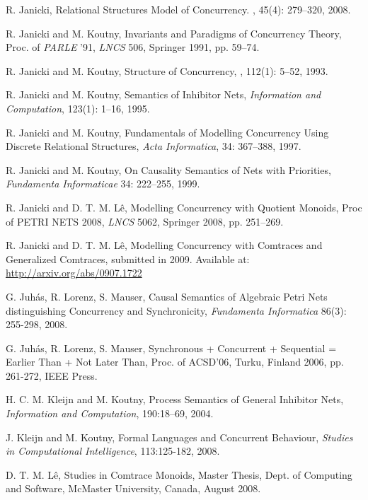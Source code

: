 \documentclass{llncs}
\begin{document}
\begin{thebibliography}{19}
R. Janicki,
\newblock Relational Structures Model of Concurrency.
, 45(4): 279--320, 2008.

R. Janicki and M. Koutny,
Invariants and Paradigms of Concurrency Theory, Proc. of \emph{PARLE} '91,
{\em LNCS} 506, Springer 1991, pp. 59--74.

R. Janicki and M. Koutny,
\newblock Structure of Concurrency,
, 112(1): 5--52, 1993.

R. Janicki and M. Koutny,
 Semantics of Inhibitor Nets,
 {\em Information and Computation}, 123(1): 1--16, 1995.

R. Janicki and M. Koutny, Fundamentals of Modelling Concurrency Using Discrete
Relational Structures, {\em Acta Informatica}, 34: 367--388, 1997.

R. Janicki and M. Koutny, On Causality Semantics of Nets with Priorities,
{\em Fundamenta Informaticae} 34: 222--255, 1999.

R. Janicki and D. T. M. L\^e, Modelling Concurrency with Quotient Monoids, Proc of PETRI NETS 2008, {\em LNCS} 5062, Springer 2008, pp. 251--269.

R. Janicki and D. T. M. L\^e, Modelling Concurrency with Comtraces and Generalized Comtraces, submitted in 2009. Available at: \href{http://arxiv.org/abs/0907.1722}{http://arxiv.org/abs/0907.1722}


G. Juh\'{a}s, R. Lorenz, S. Mauser, Causal Semantics of Algebraic Petri Nets distinguishing Concurrency and Synchronicity, {\em Fundamenta Informatica} 86(3): 255-298, 2008.

G. Juh\'{a}s, R. Lorenz, S. Mauser, Synchronous + Concurrent + Sequential = Earlier Than + Not Later Than, Proc. of ACSD'06, Turku, Finland 2006, pp. 261-272,
IEEE Press.



H. C. M. Kleijn and M. Koutny, Process Semantics of General Inhibitor Nets,
{\em Information and Computation}, 190:18--69, 2004.

J. Kleijn and M. Koutny, Formal Languages and Concurrent Behaviour,
{\em Studies in Computational Intelligence}, 113:125-182, 2008.

D. T. M. L\^e, Studies in Comtrace Monoids, Master Thesis, Dept. of Computing and Software, McMaster University, Canada, August 2008.



\end{thebibliography}
\end{document}
